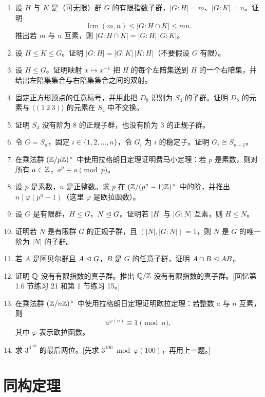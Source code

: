\begin{enumerate}[label=\arabic*.]
\begin{enumerate}[label=(\alph*)]
    \item 由于 $\{(1,1,\ldots,1)\}$ 是大小为 $1$ 的等价类，由 (e) 推出 $G$ 中存在非单位元 $x$ 使 $x^p=1$，即 $G$ 含有阶为 $p$ 的元素。[说明 $p\mid k$，所以 $k>1$。]
  \end{enumerate}
  \item 设 $H$ 与 $K$ 是（可无限）群 $G$ 的有限指数子群，$|G:H|=m$、$|G:K|=n$。证明
  \[
    \operatorname{lcm}(m,n)\leq |G:H\cap K|\leq mn.
  \]
  推出若 $m$ 与 $n$ 互素，则 $|G:H\cap K|=|G:H|\,|G:K|$。
  \item 设 $H\leq K\leq G$。证明 $|G:H|=|G:K|\,|K:H|$（不要假设 $G$ 有限）。
  \item 设 $H\leq G$。证明映射 $x\mapsto x^{-1}$ 把 $H$ 的每个左陪集送到 $H$ 的一个右陪集，并给出左陪集集合与右陪集集合之间的双射。
  \item 固定正方形顶点的任意标号，并用此把 $D_8$ 识别为 $S_4$ 的子群。证明 $D_8$ 的元素与 $\langle(1\ 2\ 3)\rangle$ 的元素在 $S_4$ 中不交换。
  \item 证明 $S_4$ 没有阶为 $8$ 的正规子群，也没有阶为 $3$ 的正规子群。
  \item 令 $G=S_n$，固定 $i\in\{1,2,
  \ldots,n\}$，令 $G_i$ 为 $i$ 的稳定子。证明 $G_i\cong S_{n-1}$。
  \item 在乘法群 $(\mathbb{Z}/p\mathbb{Z})^\times$ 中使用拉格朗日定理证明费马小定理：若 $p$ 是素数，则对所有 $a\in\mathbb{Z}$，$a^p\equiv a\pmod p$。
  \item 设 $p$ 是素数，$n$ 是正整数。求 $p$ 在 $(\mathbb{Z}/(p^n-1)\mathbb{Z})^\times$ 中的阶，并推出 $n\mid\varphi(p^n-1)$（这里 $\varphi$ 是欧拉函数）。
  \item 设 $G$ 是有限群，$H\leq G$，$N\trianglelefteq G$。证明若 $|H|$ 与 $|G:N|$ 互素，则 $H\leq N$。
  \item 证明若 $N$ 是有限群 $G$ 的正规子群，且 $(|N|,|G:N|)=1$，则 $N$ 是 $G$ 的唯一阶为 $|N|$ 的子群。
  \item 若 $A$ 是阿贝尔群且 $A\trianglelefteq G$，$B$ 是 $G$ 的任意子群，证明 $A\cap B\trianglelefteq AB$。
  \item 证明 $\mathbb{Q}$ 没有有限指数的真子群。推出 $\mathbb{Q}/\mathbb{Z}$ 没有有限指数的真子群。[回忆第 1.6 节练习 21 和第 1 节练习 15。]
  \item 在乘法群 $(\mathbb{Z}/n\mathbb{Z})^\times$ 中使用拉格朗日定理证明欧拉定理：若整数 $a$ 与 $n$ 互素，则
  \[
    a^{\varphi(n)}\equiv1\pmod n,
  \]
  其中 $\varphi$ 表示欧拉函数。
  \item 求 $3^{3^{100}}$ 的最后两位。[先求 $3^{100}\bmod\varphi(100)$，再用上一题。]
\end{enumerate}

\section{同构定理}

